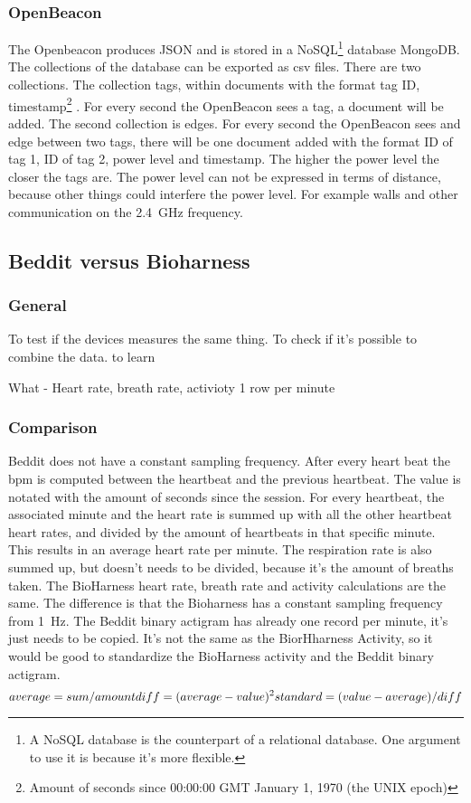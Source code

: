 		\subsubsection{OpenBeacon}
			The Openbeacon produces JSON and is stored in a NoSQL\footnote{A NoSQL database is the counterpart of a relational database. One argument to use it is because it's more flexible.} database MongoDB. The collections of the database can be exported as csv files.
			There are two collections. The collection tags, within documents with the format tag ID, timestamp\footnote{Amount of seconds since 00:00:00 GMT January 1, 1970 (the UNIX epoch)} . For every second the OpenBeacon sees a tag, a document will be added.
			The second collection is edges. For every second the OpenBeacon sees and edge between two tags, there will be one document added with the format ID of tag 1, ID of tag 2, power level and timestamp.
			The higher the power level the closer the tags are. The power level can not be expressed in terms of distance, because other things could interfere the power level. For example walls and other communication on the \SI{2.4}{\giga\hertz} frequency.
	\subsection{Beddit versus Bioharness}
		\subsubsection{General}
			To test if the devices measures the same thing.
			To check if it's possible to combine the data.
			to learn

			What - Heart rate, breath rate, activioty
			1 row per minute
		\subsubsection{Comparison}
			Beddit does not have a constant sampling frequency. After every heart beat the bpm is computed between the heartbeat and the previous heartbeat. The value is notated with the amount of seconds since the session. For every heartbeat, the associated minute and the heart rate is summed up with all the other heartbeat heart rates, and divided by the amount of heartbeats in that specific minute. This results in an average heart rate per minute. The respiration rate is also summed up, but doesn't needs to be divided, because it's the amount of breaths taken.
			The BioHarness heart rate, breath rate and activity calculations are the same. The difference is that the Bioharness has a constant sampling frequency from \SI{1}{\hertz}. 
			The Beddit binary actigram has already one record per minute, it's just needs to be copied. It's not the same as the BiorHharness Activity, so it would be good to standardize the BioHarness activity and the Beddit binary actigram.
			\begin{equation}
			average = sum / amount \\
			diff = (average - value)^2 \\
			standard = (value - average) / diff
			\end{equation}



